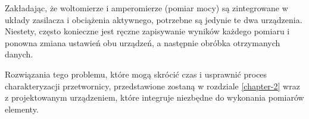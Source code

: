 Zakładając, że woltomierze i amperomierze (pomiar mocy) są zintegrowane w układy zasilacza i obciążenia aktywnego, potrzebne są jedynie te dwa urządzenia.
Niestety, często konieczne jest ręczne zapisywanie wyników każdego pomiaru i ponowna zmiana ustawień obu urządzeń, a następnie obróbka otrzymanych danych.

Rozwiązania tego problemu, które mogą skrócić czas i usprawnić proces charakteryzacji przetwornicy, przedstawione zostaną w rozdziale \ref{chapter-2} 
wraz z projektowanym urządzeniem, które integruje niezbędne do wykonania pomiarów elementy.



